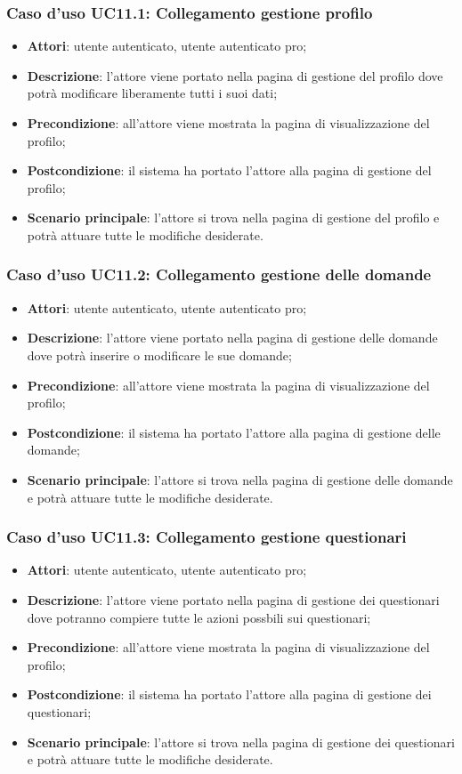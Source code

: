 \subsubsection{Caso d'uso UC11.1: Collegamento gestione profilo}
\begin{itemize}
\item\textbf{Attori}: utente autenticato, utente autenticato pro;
\item\textbf{Descrizione}: l'attore viene portato nella pagina di gestione del profilo dove potrà modificare liberamente tutti i suoi dati;
\item\textbf{Precondizione}: all'attore viene mostrata la pagina di visualizzazione del profilo;
\item\textbf{Postcondizione}: il sistema ha portato l'attore alla pagina di gestione del profilo;
\item\textbf{Scenario principale}: l'attore si trova nella pagina di gestione del profilo e potrà attuare tutte le modifiche desiderate.
\end{itemize}

\subsubsection{Caso d'uso UC11.2: Collegamento gestione delle domande}
\begin{itemize}
\item\textbf{Attori}: utente autenticato, utente autenticato pro;
\item\textbf{Descrizione}: l'attore viene portato nella pagina di gestione delle domande dove potrà inserire o modificare le sue domande;
\item\textbf{Precondizione}: all'attore viene mostrata la pagina di visualizzazione del profilo;
\item\textbf{Postcondizione}: il sistema ha portato l'attore alla pagina di gestione delle domande;
\item\textbf{Scenario principale}: l'attore si trova nella pagina di gestione delle domande e potrà attuare tutte le modifiche desiderate.
\end{itemize}

\subsubsection{Caso d'uso UC11.3: Collegamento gestione questionari}
\begin{itemize}
\item\textbf{Attori}: utente autenticato, utente autenticato pro;
\item\textbf{Descrizione}: l'attore viene portato nella pagina di gestione dei questionari dove potranno compiere tutte le azioni possbili sui questionari;
\item\textbf{Precondizione}: all'attore viene mostrata la pagina di visualizzazione del profilo;
\item\textbf{Postcondizione}: il sistema ha portato l'attore alla pagina di gestione dei questionari;
\item\textbf{Scenario principale}: l'attore si trova nella pagina di gestione dei questionari e potrà attuare tutte le modifiche desiderate.
\end{itemize}

